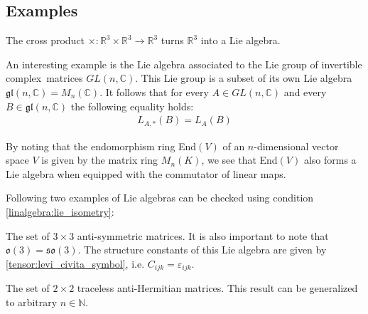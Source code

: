 
\subsection{Examples}

        \begin{example}
        	The cross product $\times:\mathbb{R}^3\times\mathbb{R}^3\rightarrow\mathbb{R}^3$ turns $\mathbb{R}^3$ into a Lie algebra.
        \end{example}
        \begin{example}
        	An interesting example is the Lie algebra associated to the Lie group of invertible complex\footnotemark\ matrices $GL(n, \mathbb{C})$. This Lie group is a subset of its own Lie algebra $\mathfrak{gl}(n, \mathbb{C}) = M_n(\mathbb{C})$. It follows that for every $A\in GL(n, \mathbb{C})$ and every $B\in\mathfrak{gl}(n, \mathbb{C})$ the following equality holds:
        	\begin{gather}
        		L_{A,\ast}(B) = L_A(B)
        	\end{gather}
        \end{example}
        \begin{result}\label{lie:end_as_lie_algebra}
        	By noting that the endomorphism ring End$(V)$ of an $n$-dimensional vector space $V$ is given by the matrix ring $M_n(K)$, we see that End$(V)$ also forms a Lie algebra when equipped with the commutator of linear maps.
        \end{result}
        
        Following two examples of Lie algebras can be checked using condition \ref{linalgebra:lie_isometry}:
        \begin{example}
        	The set of $3\times3$ anti-symmetric matrices. It is also important to note that $\mathfrak{o}(3) = \mathfrak{so}(3)$. The structure constants of this Lie algebra are given by \ref{tensor:levi_civita_symbol}, i.e. $C_{ijk} = \varepsilon_{ijk}$.
        \end{example}
        \begin{example}
        	The set of $2\times2$ traceless anti-Hermitian matrices. This result can be generalized to arbitrary $n\in\mathbb{N}$.
        \end{example}
        
